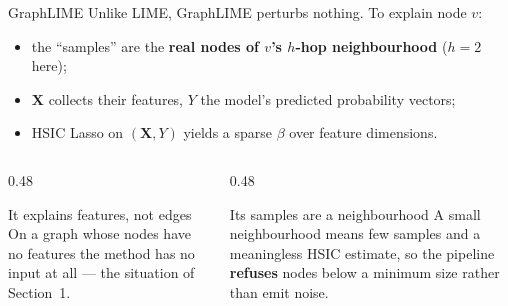 \documentclass[10pt,aspectratio=169]{beamer}
\newcommand{\Xmat}{\mathbf{X}}
\begin{document}
\begin{frame}{GraphLIME}
  Unlike LIME, GraphLIME \alert{perturbs nothing}. To explain node $v$:

  \begin{itemize}
    \item the ``samples'' are the \textbf{real nodes of $v$'s $h$-hop
      neighbourhood} ($h=2$ here);
    \item $\Xmat$ collects their features, $Y$ the model's predicted
      probability vectors;
    \item HSIC Lasso on $(\Xmat, Y)$ yields a sparse $\beta$ over feature
      dimensions.
  \end{itemize}

  \vfill
  \begin{columns}[T,onlytextwidth]
    \begin{column}{0.48\textwidth}
      \begin{alertblock}{It explains features, not edges}
        On a graph whose nodes have no features the method has no input at
        all --- the situation of Section~1.
      \end{alertblock}
    \end{column}
    \begin{column}{0.48\textwidth}
      \begin{alertblock}{Its samples are a neighbourhood}
        A small neighbourhood means few samples and a meaningless HSIC
        estimate, so the pipeline \textbf{refuses} nodes below a minimum
        size rather than emit noise.
      \end{alertblock}
    \end{column}
  \end{columns}
\end{frame}
\end{document}
